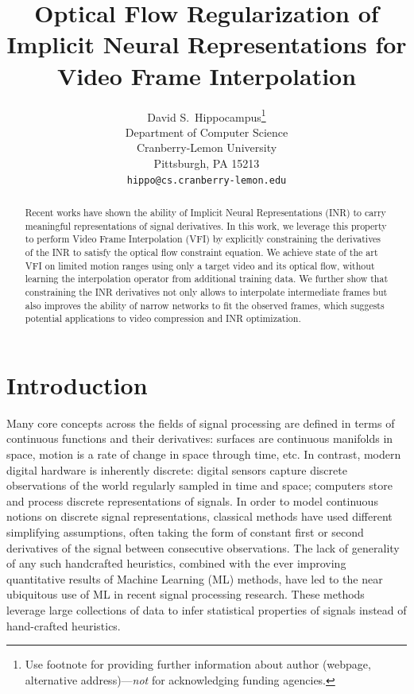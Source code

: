 \documentclass{article}
\title{Optical Flow Regularization of Implicit Neural Representations for Video Frame Interpolation}
\author{%
  David S.~Hippocampus\thanks{Use footnote for providing further information
    about author (webpage, alternative address)---\emph{not} for acknowledging
    funding agencies.} \\
  Department of Computer Science\\
  Cranberry-Lemon University\\
  Pittsburgh, PA 15213 \\
  \texttt{hippo@cs.cranberry-lemon.edu} \\
}
\begin{document}
\maketitle


\begin{abstract}
Recent works have shown the ability of Implicit Neural Representations (INR) to carry meaningful representations of signal derivatives.
In this work, we leverage this property to perform Video Frame Interpolation (VFI)
by explicitly constraining the derivatives of the INR to satisfy the optical flow constraint equation.
We achieve state of the art VFI on limited motion ranges
using only a target video and its optical flow, without learning the interpolation operator from additional training data.
We further show that constraining the INR derivatives not only
allows to interpolate intermediate frames but also improves the ability of narrow networks to fit the observed frames,
which suggests potential applications to video compression and INR optimization.
\end{abstract}

\section{Introduction}

Many core concepts across the fields of signal processing are defined in terms of continuous functions and their derivatives:
surfaces are continuous manifolds in space,
motion is a rate of change in space through time, etc.
In contrast, modern digital hardware is inherently discrete:
digital sensors capture discrete observations of the world regularly sampled in time and space;
computers store and process discrete representations of signals.
In order to model continuous notions on discrete signal representations,
classical methods have used different simplifying assumptions,
often taking the form of constant first or second derivatives
of the signal between consecutive observations.
The lack of generality of any such handcrafted heuristics,
combined with the ever improving quantitative results of Machine Learning (ML) methods,
have led to the near ubiquitous use of ML in recent signal processing research.
These methods leverage large collections of data to infer statistical properties of signals instead of hand-crafted heuristics.
\end{document}

